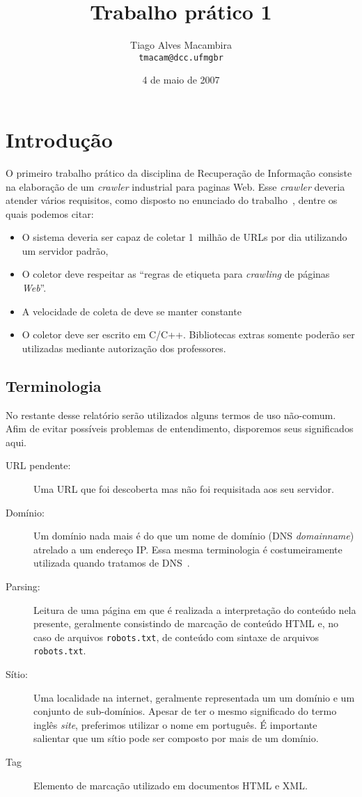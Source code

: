 \documentclass[10pt,twocolumn]{article}
\title{Trabalho prático 1}
\author{Tiago Alves Macambira \\ \texttt{tmacam@dcc.ufmgbr}}
\date{4 de maio de 2007}
\begin{document}
\maketitle

\section{Introdução}

O primeiro trabalho prático da disciplina de Recuperação de Informação
consiste na elaboração de um \emph{crawler} industrial para paginas Web.
Esse \emph{crawler} deveria atender vários requisitos, como disposto no
enunciado do trabalho~\cite{tp1}, dentre os quais podemos citar:
\begin{itemize}
\item O sistema deveria ser capaz de coletar 1~milhão de URLs por dia
utilizando um servidor padrão,
\item O coletor deve respeitar as ``regras de etiqueta para
\emph{crawling} de páginas \emph{Web}''.
\item A velocidade de coleta de deve se manter constante
\item O coletor deve ser escrito em C/C++. Bibliotecas extras somente
poderão ser utilizadas mediante autorização dos professores.
\end{itemize}

\subsection{Terminologia}

No restante desse relatório serão utilizados alguns termos de uso
não-comum. Afim de evitar possíveis problemas de entendimento,
disporemos seus significados aqui.

\begin{description}
\item[URL pendente:] Uma URL que foi descoberta mas não foi requisitada aos seu
servidor.
\item[Domínio:] Um domínio nada mais é do que um nome de domínio
(DNS \emph{domainname}) atrelado a um
endereço IP. Essa mesma terminologia é costumeiramente utilizada quando
tratamos de DNS~\cite{rfc1034}.
\item[Parsing:] Leitura de uma página em que é realizada a interpretação do
conteúdo nela presente, geralmente consistindo de marcação de conteúdo HTML e,
no caso de arquivos \texttt{robots.txt}, de conteúdo com sintaxe de arquivos
\texttt{robots.txt}.
\item[Sítio:] Uma localidade na internet, geralmente representada um um domínio
e um conjunto de sub-domínios. Apesar de ter o mesmo significado do termo
inglês \emph{site}, preferimos utilizar o nome em português. É importante
salientar que um sítio pode ser composto por mais de um domínio.
\item[Tag] Elemento de marcação utilizado em documentos HTML e XML.
\end{description}
\end{document}
